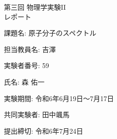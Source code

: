 \begin{titlepage}
  \centering
  \vspace*{4cm}
  \Huge{第三回 物理学実験II\\レポート}
  
  \vspace*{1cm}
  \large{課題名: 原子分子のスペクトル}
  
  \vspace*{0.1cm}
  \large{担当教員名: 吉澤}

  \vspace*{0.5cm}
  \large{実験者番号: 59}

  \vspace{0.1cm}
  \large{氏名: 森 佑一}

  \vspace*{0.1cm}
  \large{実験期間: 令和6年6月19日〜7月17日}

  \vspace{0.5cm}
  \large{共同実験者: 田中颯馬}
  
  \vspace{0.1cm}
  \large{提出締切: 令和6年7月24日}
  \centering
\end{titlepage}